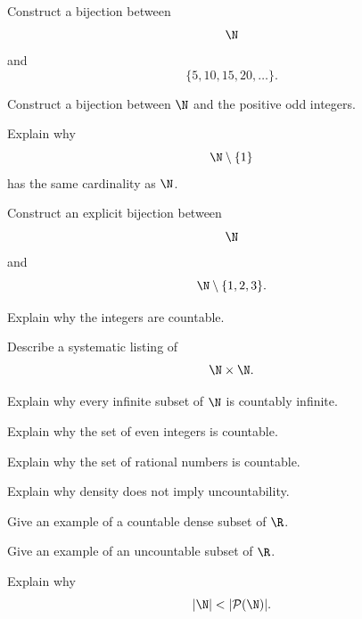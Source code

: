 \begin{exercise}[1]
Construct a bijection between
\[ \N \]
and
\[ \{5,10,15,20,\ldots\}. \]
\end{exercise}

\begin{exercise}[1]
Construct a bijection between \(\N\) and the positive odd integers.
\end{exercise}

\begin{exercise}[2]
Explain why
\[ \N\setminus\{1\} \]
has the same cardinality as \(\N\).
\end{exercise}

\begin{exercise}[2]
Construct an explicit bijection between
\[ \N \]
and
\[ \N\setminus\{1,2,3\}. \]
\end{exercise}

\begin{exercise}[2]
Explain why the integers are countable.
\end{exercise}

\begin{exercise}[2]
Describe a systematic listing of
\[ \N\times\N. \]
\end{exercise}

\begin{exercise}[2]
Explain why every infinite subset of \(\N\) is countably infinite.
\end{exercise}

\begin{exercise}[2]
Explain why the set of even integers is countable.
\end{exercise}

\begin{exercise}[2]
Explain why the set of rational numbers is countable.
\end{exercise}

\begin{exercise}[2]
Explain why density does not imply uncountability.
\end{exercise}

\begin{exercise}[2]
Give an example of a countable dense subset of \(\R\).
\end{exercise}

\begin{exercise}[2]
Give an example of an uncountable subset of \(\R\).
\end{exercise}

\begin{exercise}[2]
Explain why
\[ |\N|<|\mathcal P(\N)|. \]
\end{exercise}


